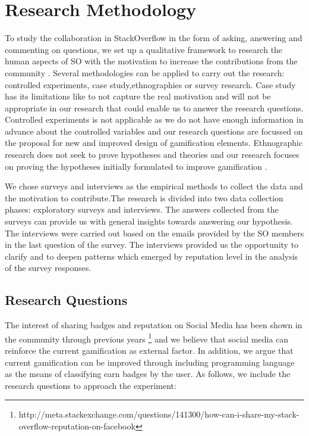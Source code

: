 \documentclass{sigchi}
\begin{document}
\section{Research Methodology}
To study the collaboration in StackOverflow in the form of asking, answering and commenting on questions, we set up a qualitative  framework to research the human aspects of SO with the motivation to increase the contributions from the community \cite{Easterbrook}. Several methodologies can be applied to carry out the research: controlled experiments, case study,ethnographies or survey research. Case study has its limitations like to not capture the real motivation and will not be appropriate in our research that could enable us to answer the research questions. Controlled experiments is not applicable as we do not have enough information in advance about the controlled variables and our research questions are focussed on the proposal for new and improved design of gamification elements. Ethnographic research does not seek to prove hypotheses and theories and our research focuses on proving the hypotheses initially formulated to improve gamification \cite{Easterbrook}.


We chose surveys and interviews as the empirical methods to collect the data and the motivation to contribute.The research is divided into two data collection phases: exploratory surveys and interviews. The answers collected from the surveys can provide us with general insights towards answering our hypothesis. The interviews were carried out based on the emails provided by the SO members in the last question of the survey. The interviews provided us the opportunity to clarify and to deepen patterns which emerged by reputation level in the analysis of the survey responses.

\subsection{Research Questions}
The interest of sharing badges and reputation on Social Media has been shown in the community through previous years \footnote{http://meta.stackexchange.com/questions/141300/how-can-i-share-my-stack-overflow-reputation-on-facebook} and we believe that social media can reinforce the current gamification as external factor. In addition, we argue that current gamification can be improved through including programming language as the means of classifying earn badges by the user. As follows, we include the research questions to approach the experiment:
\end{document}
